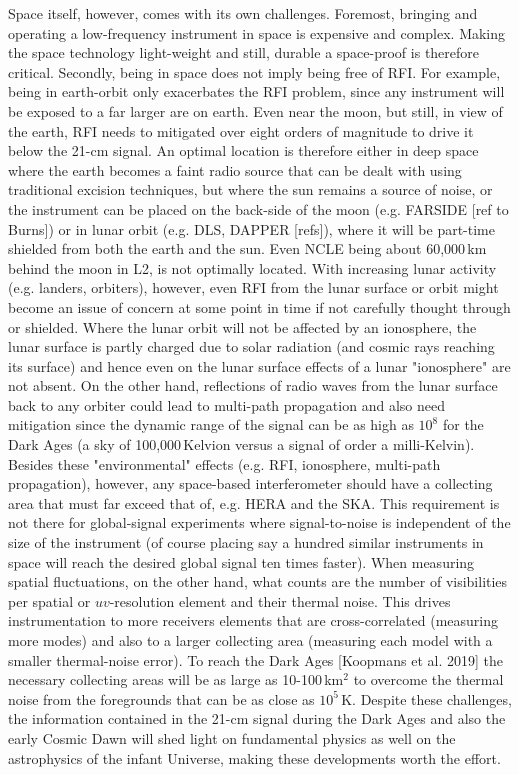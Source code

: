 Space itself, however, comes with its own challenges. Foremost, bringing and operating a low-frequency instrument in space is expensive and complex. Making the space technology light-weight and still, durable a space-proof is therefore critical. Secondly, being in space does not imply being free of RFI. For example, being in earth-orbit only exacerbates the RFI problem, since any instrument will be exposed to a far larger are on earth. Even near the moon, but still, in view of the earth, RFI needs to mitigated over eight orders of magnitude to drive it below the 21-cm signal. An optimal location is therefore either in deep space where the earth becomes a faint radio source that can be dealt with using traditional excision techniques, but where the sun remains a source of noise, or the instrument can be placed on the back-side of the moon (e.g. FARSIDE [ref to Burns]) or in lunar orbit (e.g. DLS, DAPPER [refs]), where it will be part-time shielded from both the earth and the sun. Even NCLE being about 60,000\,km behind the moon in L2, is not optimally located. With increasing lunar activity (e.g. landers, orbiters), however, even RFI from the lunar surface or orbit might become an issue of concern at some point in time if not carefully thought through or shielded. Where the lunar orbit will not be affected by an ionosphere, the lunar surface is partly charged due to solar radiation (and cosmic rays reaching its surface) and hence even on the lunar surface effects of a lunar "ionosphere" are not absent. On the other hand, reflections of radio waves from the lunar surface back to any orbiter could lead to multi-path propagation and also need mitigation since the dynamic range of the signal can be as high as $10^8$ for the Dark Ages (a sky of 100,000\,Kelvion versus a signal of order a milli-Kelvin).  
Besides these "environmental" effects (e.g. RFI, ionosphere, multi-path propagation), however, any space-based interferometer should have a collecting area that must far exceed that of, e.g. HERA and the SKA. This requirement is not there for global-signal experiments where signal-to-noise is independent of the size of the instrument (of course placing say a hundred similar instruments in space will reach the desired global signal ten times faster). When measuring spatial fluctuations, on the other hand, what counts are the number of visibilities per spatial or $uv$-resolution element and their thermal noise. This drives instrumentation to more receivers elements that are cross-correlated (measuring more modes) and also to a larger collecting area (measuring each model with a smaller thermal-noise error).  To reach the Dark Ages [Koopmans et al. 2019] the necessary collecting areas will be as large as 10-100\,km$^2$ to overcome the thermal noise from the foregrounds that can be as close as $10^5$\,K. Despite these challenges, the information contained in the 21-cm signal during the Dark Ages and also the early Cosmic Dawn will shed light on fundamental physics as well on the astrophysics of the infant Universe, making these developments worth the effort.     


